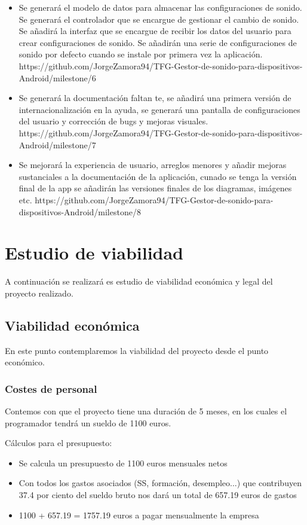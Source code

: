 \begin{itemize}
	\item Se generará el modelo de datos para almacenar las configuraciones de sonido. Se generará el controlador que se encargue de gestionar el cambio de sonido. Se añadirá la interfaz que se encargue de recibir los datos del usuario para crear configuraciones de sonido. Se añadirán una serie de configuraciones de sonido por defecto cuando se instale por primera vez la aplicación. https://github.com/JorgeZamora94/TFG-Gestor-de-sonido-para-dispositivos-Android/milestone/6
	\item Se generará la documentación faltan te, se añadirá una primera versión de internacionalización en la ayuda, se generará una pantalla de configuraciones del usuario y corrección de bugs y mejoras visuales. https://github.com/JorgeZamora94/TFG-Gestor-de-sonido-para-dispositivos-Android/milestone/7
	\item Se mejorará la experiencia de usuario, arreglos menores y añadir mejoras sustanciales a la documentación de la aplicación, cunado se tenga la versión final de la app se añadirán las versiones finales de los diagramas, imágenes etc. https://github.com/JorgeZamora94/TFG-Gestor-de-sonido-para-dispositivos-Android/milestone/8
\end{itemize}



\section{Estudio de viabilidad}
A continuación se realizará es estudio de viabilidad económica y legal del proyecto realizado.
\subsection{Viabilidad económica}
En este punto contemplaremos la viabilidad del proyecto desde el punto económico.
\subsubsection{Costes de personal}
Contemos con que el proyecto tiene una duración de 5 meses, en los cuales el programador tendrá un sueldo de 1100 euros.

Cálculos para el presupuesto:

\begin{itemize}
	\item Se calcula un presupuesto de 1100 euros mensuales netos
	\item Con todos los gastos asociados (SS, formación, desempleo...) que contribuyen 37.4 por ciento del sueldo bruto nos dará un total de 657.19 euros de gastos
	\item 1100 + 657.19 =  1757.19 euros a pagar mensualmente la empresa
\end{itemize}

